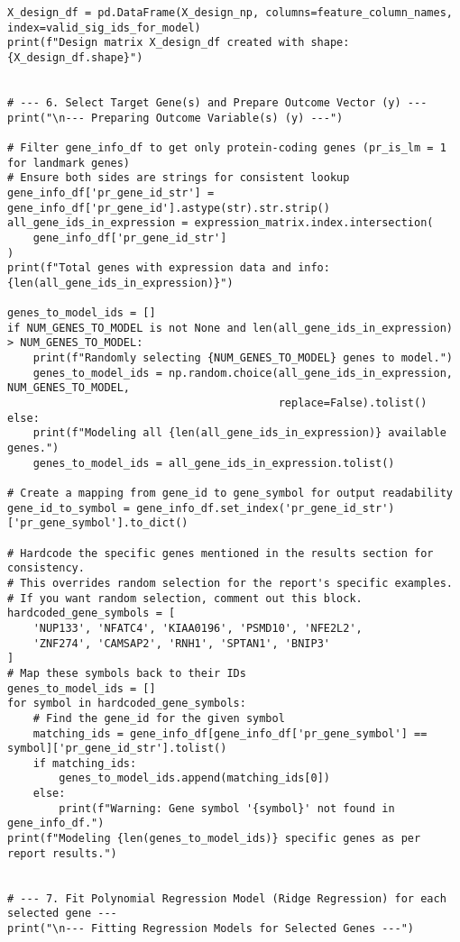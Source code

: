 \documentclass[12pt]{article}
\begin{document}
\begin{lstlisting}[caption={Python Analysis Script}]
X_design_df = pd.DataFrame(X_design_np, columns=feature_column_names, index=valid_sig_ids_for_model)
print(f"Design matrix X_design_df created with shape: {X_design_df.shape}")


# --- 6. Select Target Gene(s) and Prepare Outcome Vector (y) ---
print("\n--- Preparing Outcome Variable(s) (y) ---")

# Filter gene_info_df to get only protein-coding genes (pr_is_lm = 1 for landmark genes)
# Ensure both sides are strings for consistent lookup
gene_info_df['pr_gene_id_str'] = gene_info_df['pr_gene_id'].astype(str).str.strip()
all_gene_ids_in_expression = expression_matrix.index.intersection(
    gene_info_df['pr_gene_id_str']
)
print(f"Total genes with expression data and info: {len(all_gene_ids_in_expression)}")

genes_to_model_ids = []
if NUM_GENES_TO_MODEL is not None and len(all_gene_ids_in_expression) > NUM_GENES_TO_MODEL:
    print(f"Randomly selecting {NUM_GENES_TO_MODEL} genes to model.")
    genes_to_model_ids = np.random.choice(all_gene_ids_in_expression, NUM_GENES_TO_MODEL, 
                                          replace=False).tolist()
else:
    print(f"Modeling all {len(all_gene_ids_in_expression)} available genes.")
    genes_to_model_ids = all_gene_ids_in_expression.tolist()

# Create a mapping from gene_id to gene_symbol for output readability
gene_id_to_symbol = gene_info_df.set_index('pr_gene_id_str')['pr_gene_symbol'].to_dict()

# Hardcode the specific genes mentioned in the results section for consistency.
# This overrides random selection for the report's specific examples.
# If you want random selection, comment out this block.
hardcoded_gene_symbols = [
    'NUP133', 'NFATC4', 'KIAA0196', 'PSMD10', 'NFE2L2',
    'ZNF274', 'CAMSAP2', 'RNH1', 'SPTAN1', 'BNIP3'
]
# Map these symbols back to their IDs
genes_to_model_ids = []
for symbol in hardcoded_gene_symbols:
    # Find the gene_id for the given symbol
    matching_ids = gene_info_df[gene_info_df['pr_gene_symbol'] == symbol]['pr_gene_id_str'].tolist()
    if matching_ids:
        genes_to_model_ids.append(matching_ids[0])
    else:
        print(f"Warning: Gene symbol '{symbol}' not found in gene_info_df.")
print(f"Modeling {len(genes_to_model_ids)} specific genes as per report results.")


# --- 7. Fit Polynomial Regression Model (Ridge Regression) for each selected gene ---
print("\n--- Fitting Regression Models for Selected Genes ---")


\end{lstlisting}
\end{document}
